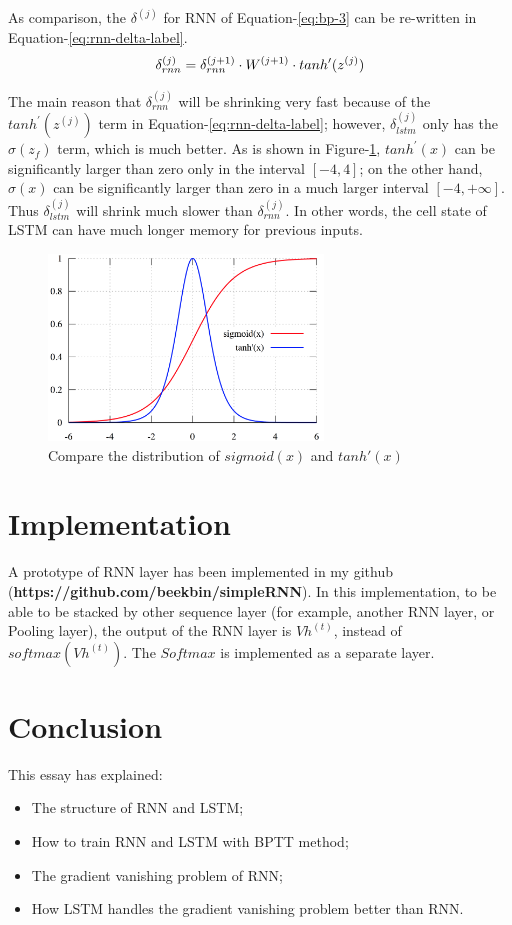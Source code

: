 \documentclass[english]{article}
\begin{document}
As comparison, the $\delta^{(j)}$ for RNN of Equation-\ref{eq:bp-3} can be re-written in Equation-\ref{eq:rnn-delta-label}.
\begin{equation}\label{eq:rnn-delta-label}
 \delta^{(j)}_{rnn} = \delta^{(j+1)}_{rnn} \cdot W^{(j+1)} \cdot tanh^{\prime}(z^{(j)})\\
\end{equation}

The main reason that $\delta^{(j)}_{rnn}$ will be shrinking very fast because of the $tanh^{\prime}(z^{(j)})$ term in Equation-\ref{eq:rnn-delta-label};
however, $\delta^{(j)}_{lstm}$ only has the $\sigma(z_f)$ term, which is much better. As is shown in Figure-\ref{fig:compare}, $tanh^{\prime}(x)$ 
can be significantly larger than zero only in the interval $[-4, 4]$; on the other hand, $\sigma(x)$  can be significantly larger than zero in a much larger
interval $[-4, +\infty]$. Thus $\delta^{(j)}_{lstm}$ will shrink much slower than $\delta^{(j)}_{rnn}$. In other words, the cell state of LSTM can have much
longer memory for previous inputs.

\begin{figure}[htbp]
	\centering
	\includegraphics[width=0.65\textwidth, keepaspectratio]{compare}
	\caption{Compare the distribution of $sigmoid(x)$ and $tanh'(x)$}
	\label{fig:compare}
\end{figure}

\section{Implementation}
A prototype of RNN layer has been implemented in my github (\textbf{https://github.com/beekbin/simpleRNN}). 
In this implementation, to be able to be stacked by other sequence layer (for example, another RNN layer, or Pooling layer), the output of the RNN
layer is $Vh^{(t)}$, instead of $softmax(Vh^{(t)})$.  The $Softmax$ is implemented as a separate layer.


\section{Conclusion}
This essay has explained:
 \begin{itemize}
  \item The structure of RNN and LSTM;
  \item How to train RNN and LSTM with BPTT method;
  \item The gradient vanishing problem of RNN;
  \item How LSTM handles the gradient vanishing problem better than RNN.
 \end{itemize}




\end{document}

